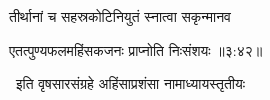 \nemslokac

{\devanagarifont तीर्थानां च सहस्रकोटिनियुतं स्नात्वा सकृन्मानव }%
  \dontdisplaylinenum    {}%



\nemslokad

{\devanagarifont एतत्पुण्यफलमहिंसकजनः प्राप्नोति निःसंशयः {॥३:४२॥} \veg\dontdisplaylinenum }%

\vers


{\devanagarifont 
\jump
\begin{center}
\ketdanda~इति वृषसारसंग्रहे अहिंसाप्रशंसा नामाध्यायस्तृतीयः~\ketdanda
\end{center}
\dontdisplaylinenum\vers  }%
